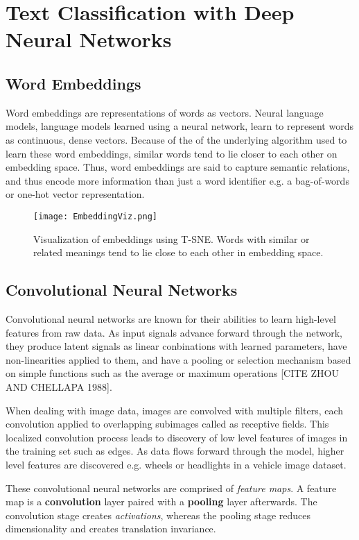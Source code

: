
\chapter{Text Classification with Deep Neural Networks}\label{TXT-CLASS}

\section{Word Embeddings}
Word embeddings are representations of words as vectors.
Neural language models, language models learned using a neural network, learn to represent words as continuous, dense vectors.
Because of the of the underlying algorithm used to learn these word embeddings, similar words tend to lie closer to each other on embedding space.
Thus, word embeddings are said to capture semantic relations, and thus encode more information than just a word identifier e.g.
a bag-of-words or one-hot vector representation.

\begin{figure}[h]
\caption{Visualization of embeddings using T-SNE. Words with similar or related meanings
tend to lie close to each other in embedding space.}
\centering
\texttt{[image: EmbeddingViz.png]}
\end{figure}

\section{Convolutional Neural Networks}
Convolutional neural networks are known for their abilities to learn high-level features from raw data. As input signals advance
forward through the network, they produce latent signals as linear conbinations with learned parameters, have non-linearities applied
to them, and have a pooling or selection mechanism based on simple functions such as the average or maximum operations [CITE ZHOU AND CHELLAPA 1988].

When dealing with image data, images are convolved with multiple filters, each convolution applied to overlapping subimages called as receptive fields.
This localized convolution process leads to discovery of low level features of images in the training set such as edges. As data
flows forward through the model, higher level features are discovered e.g. wheels or headlights in a vehicle image dataset.

These convolutional neural networks are comprised of \textit{feature maps}. A feature map is a \textbf{convolution} layer paired with a
\textbf{pooling} layer afterwards. The convolution stage creates \textit{activations}, whereas the pooling stage
reduces dimensionality and creates translation invariance.

